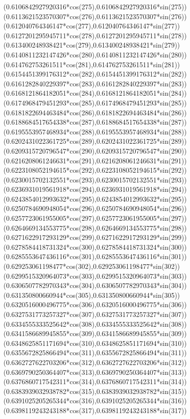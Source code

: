 {({0.6106842927920316*cos(275)},{0.6106842927920316*sin(275)})
({0.6113621523570307*cos(276)},{0.6113621523570307*sin(276)})
({0.612040764346147*cos(277)},{0.612040764346147*sin(277)})
({0.6127201295945711*cos(278)},{0.6127201295945711*sin(278)})
({0.613400248938421*cos(279)},{0.613400248938421*sin(279)})
({0.6140811232147426*cos(280)},{0.6140811232147426*sin(280)})
({0.614762753261511*cos(281)},{0.614762753261511*sin(281)})
({0.6154451399176312*cos(282)},{0.6154451399176312*sin(282)})
({0.6161282840229397*cos(283)},{0.6161282840229397*sin(283)})
({0.6168121864182051*cos(284)},{0.6168121864182051*sin(284)})
({0.6174968479451293*cos(285)},{0.6174968479451293*sin(285)})
({0.6181822694463484*cos(286)},{0.6181822694463484*sin(286)})
({0.6188684517654338*cos(287)},{0.6188684517654338*sin(287)})
({0.6195553957468934*cos(288)},{0.6195553957468934*sin(288)})
({0.6202431022361725*cos(289)},{0.6202431022361725*sin(289)})
({0.6209315720796547*cos(290)},{0.6209315720796547*sin(290)})
({0.6216208061246631*cos(291)},{0.6216208061246631*sin(291)})
({0.6223108052194615*cos(292)},{0.6223108052194615*sin(292)})
({0.6230015702132551*cos(293)},{0.6230015702132551*sin(293)})
({0.6236931019561918*cos(294)},{0.6236931019561918*sin(294)})
({0.6243854012993632*cos(295)},{0.6243854012993632*sin(295)})
({0.6250784690948054*cos(296)},{0.6250784690948054*sin(296)})
({0.6257723061955005*cos(297)},{0.6257723061955005*sin(297)})
({0.6264669134553775*cos(298)},{0.6264669134553775*sin(298)})
({0.6271622917293129*cos(299)},{0.6271622917293129*sin(299)})
({0.6278584418731324*cos(300)},{0.6278584418731324*sin(300)})
({0.6285553647436116*cos(301)},{0.6285553647436116*sin(301)})
({0.629253061198477*cos(302)},{0.629253061198477*sin(302)})
({0.6299515320964073*cos(303)},{0.6299515320964073*sin(303)})
({0.6306507782970343*cos(304)},{0.6306507782970343*sin(304)})
({0.631350800660944*cos(305)},{0.631350800660944*sin(305)})
({0.6320516000496775*cos(306)},{0.6320516000496775*sin(306)})
({0.6327531773257327*cos(307)},{0.6327531773257327*sin(307)})
({0.6334555333525642*cos(308)},{0.6334555333525642*sin(308)})
({0.6341586689945855*cos(309)},{0.6341586689945855*sin(309)})
({0.6348625851171694*cos(310)},{0.6348625851171694*sin(310)})
({0.6355672825866494*cos(311)},{0.6355672825866494*sin(311)})
({0.6362727622703206*cos(312)},{0.6362727622703206*sin(312)})
({0.6369790250364407*cos(313)},{0.6369790250364407*sin(313)})
({0.6376860717542311*cos(314)},{0.6376860717542311*sin(314)})
({0.6383939032938782*cos(315)},{0.6383939032938782*sin(315)})
({0.6391025205265344*cos(316)},{0.6391025205265344*sin(316)})
({0.6398119243243188*cos(317)},{0.6398119243243188*sin(317)})
}
